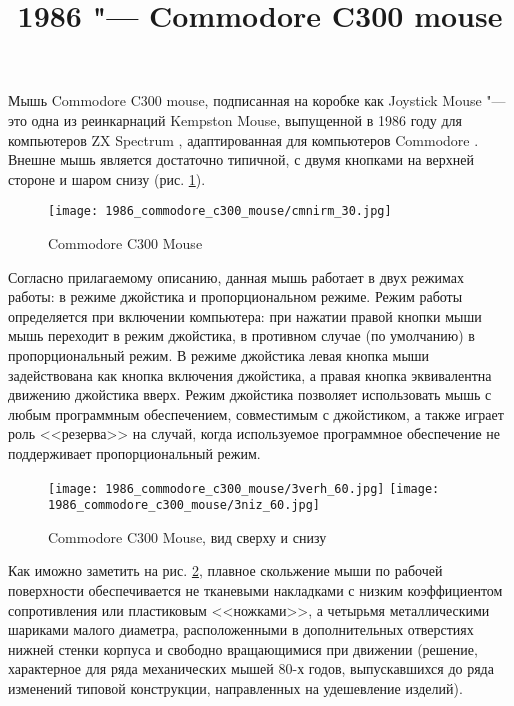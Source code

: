 \documentclass[11pt, a4paper]{article}
\begin{document}
\title{1986 "--- Commodore C300 mouse}
\date{}
\maketitle
{}
Мышь Commodore C300 mouse, подписанная на коробке как Joystick Mouse "--- это одна из реинкарнаций Kempston Mouse, выпущенной в 1986 году для компьютеров ZX Spectrum \cite{SinclairUser}, адаптированная для компьютеров Commodore \cite{c64wiki}. Внешне мышь является достаточно типичной, с двумя кнопками на верхней стороне и шаром снизу (рис. \ref{fig:C300Pic}).

\begin{figure}[h]
    \centering
    \texttt{[image: 1986\_commodore\_c300\_mouse/cmnirm\_30.jpg]}
    \caption{Commodore C300 Mouse}
    \label{fig:C300Pic}
\end{figure}

Согласно прилагаемому описанию, данная мышь работает в двух режимах работы: в режиме джойстика и пропорциональном режиме. Режим работы определяется при включении компьютера: при нажатии правой кнопки мыши мышь переходит в режим джойстика, в противном случае (по умолчанию) в пропорциональный режим. В режиме джойстика левая кнопка мыши задействована как кнопка включения джойстика, а правая кнопка эквивалентна движению джойстика вверх. Режим джойстика позволяет использовать мышь с любым программным обеспечением, совместимым с джойстиком, а также играет роль <<резерва>> на случай, когда используемое программное обеспечение не поддерживает пропорциональный режим.


\begin{figure}[h]
    \centering
    \texttt{[image: 1986\_commodore\_c300\_mouse/3verh\_60.jpg]}
    \texttt{[image: 1986\_commodore\_c300\_mouse/3niz\_60.jpg]}
    \caption{Commodore C300 Mouse, вид сверху и снизу}
    \label{fig:C300TopAndBottom}
\end{figure}

Как иможно заметить на рис. \ref{fig:C300TopAndBottom}, плавное скольжение мыши по рабочей поверхности обеспечивается не тканевыми накладками с низким коэффициентом сопротивления или пластиковым <<ножками>>, а четырьмя металлическими шариками малого диаметра, расположенными в дополнительных отверстиях нижней стенки корпуса и свободно вращающимися при движении (решение, характерное для ряда механических мышей 80-х годов, выпускавшихся до ряда изменений типовой конструкции, направленных на удешевление изделий).
\end{document}
